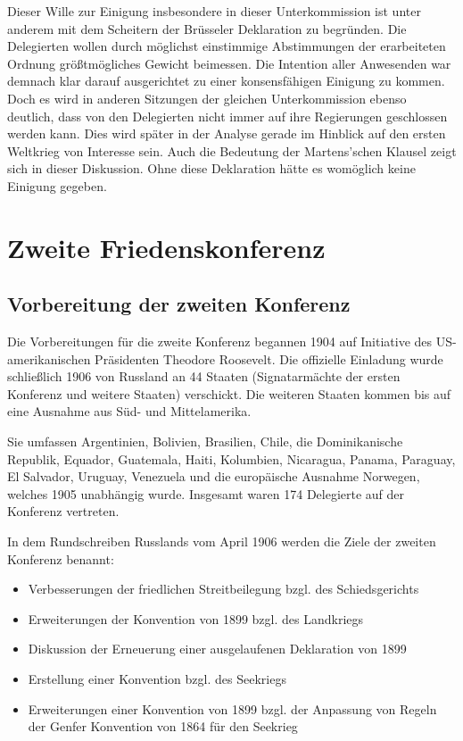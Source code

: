 \documentclass[12pt]{scrartcl}
\begin{document}
Dieser Wille zur Einigung insbesondere in dieser Unterkommission ist unter anderem mit dem Scheitern der Brüsseler Deklaration zu begründen. Die Delegierten wollen durch möglichst einstimmige Abstimmungen der erarbeiteten Ordnung größtmögliches Gewicht beimessen. Die Intention aller Anwesenden war demnach klar darauf ausgerichtet zu einer konsensfähigen Einigung zu kommen. Doch es wird in anderen Sitzungen der gleichen Unterkommission ebenso deutlich, dass von den Delegierten nicht immer auf ihre Regierungen geschlossen werden kann. Dies wird später in der Analyse gerade im Hinblick auf den ersten Weltkrieg von Interesse sein. Auch die Bedeutung der Martens'schen Klausel zeigt sich in dieser Diskussion. Ohne diese Deklaration hätte es womöglich keine Einigung gegeben.

\section{Zweite Friedenskonferenz}

\subsection{Vorbereitung der zweiten Konferenz}

Die Vorbereitungen für die zweite Konferenz begannen 1904 auf Initiative des US-amerikanischen Präsidenten Theodore Roosevelt. Die offizielle Einladung wurde schließlich 1906 von Russland an 44 Staaten (Signatarmächte der ersten Konferenz und weitere Staaten) verschickt. Die weiteren Staaten kommen bis auf eine Ausnahme aus Süd- und Mittelamerika.

Sie umfassen Argentinien, Bolivien, Brasilien, Chile, die Dominikanische Republik, Equador, Guatemala, Haiti, Kolumbien, Nicaragua, Panama, Paraguay, El Salvador, Uruguay, Venezuela und die europäische Ausnahme Norwegen, welches 1905 unabhängig wurde. Insgesamt waren 174 Delegierte auf der Konferenz vertreten.\cite{Buss1992}

In dem Rundschreiben Russlands vom April 1906 werden die Ziele der zweiten Konferenz benannt\cite{Scott-V1-1921}:

\begin{itemize}
	\item Verbesserungen der friedlichen Streitbeilegung bzgl. des Schiedsgerichts
	\item Erweiterungen der Konvention von 1899 bzgl. des Landkriegs
	\item Diskussion der Erneuerung einer ausgelaufenen Deklaration von 1899
	\item Erstellung einer Konvention bzgl. des Seekriegs
	\item Erweiterungen einer Konvention von 1899 bzgl. der Anpassung von Regeln der Genfer Konvention von 1864 für den Seekrieg
\end{itemize}
\end{document}
